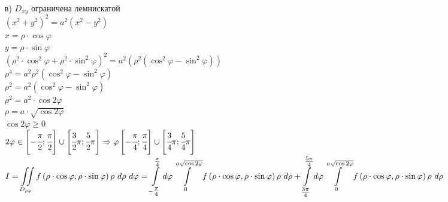 \begin{enumerate}
\item[в)] $D_{xy}$ ограничена лемнискатой \\
$(x^2 + y^2)^2 = a^2 (x^2 - y^2)$ \\
$x = \rho \cdot \cos{\varphi}$ \\
$y = \rho \cdot \sin{\varphi}$ \\
$\left(\rho^2 \cdot \cos^2{\varphi} + \rho^2 \cdot \sin^2{\varphi} \right)^2 = a^2 \left(\rho^2 (\cos^2{\varphi} - \sin^2{\varphi}) \right)$ \\
$\rho^4 = a^2 \rho^2 (\cos^2{\varphi} - \sin^2{\varphi})$ \\
$\rho^2 = a^2 (\cos^2{\varphi} - \sin^2{\varphi})$ \\
$\rho^2 = a^2 \cdot \cos{2\varphi}$ \\
$\rho = a \cdot \sqrt{\cos{2\varphi}}$ \\
$\cos{2\varphi} \geqslant 0$ \\
$2 \varphi \in \left[ -\cfrac{\pi}{2} ; \cfrac{\pi}{2} \right] \cup \left[ \cfrac{3}{2}\pi ; \cfrac{5}{2} \pi \right] \Rightarrow 
\varphi \left[- \cfrac{\pi}{4} ; \cfrac{\pi}{4}\right] \cup \left[ \cfrac{3}{4} \pi ; \cfrac{5}{4} \pi \right]$ \\
$\displaystyle  I = \iint\limits_{D_{\rho \varphi}} \polarFunction \polarJacobian = \int\limits_{-\tfrac{\pi}{4}}^{\tfrac{\pi}{4}} d\varphi \int\limits_{0}^{a \sqrt{\cos{2\varphi}}} \polarFunction \rho \ d\rho + \int\limits_{\tfrac{3\pi}{4}}^{\tfrac{5\pi}{4}} d\varphi \int\limits_{0}^{a \sqrt{\cos{2\varphi}}} \polarFunction \rho \ d\rho$ \\
\end{enumerate}

